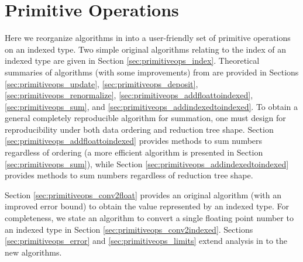 \section{Primitive Operations}
    \label{sec:primitiveops}
    Here we reorganize algorithms in \cite{repsum} into a user-friendly set of
    primitive operations on an indexed type. Two simple original algorithms
    relating to the index of an indexed type are given in Section
    \ref{sec:primitiveops_index}. Theoretical summaries of algorithms (with
    some improvements) from \cite{repsum} are provided in Sections
    \ref{sec:primitiveops_update}, \ref{sec:primitiveops_deposit},
    \ref{sec:primitiveops_renormalize},
    \ref{sec:primitiveops_addfloattoindexed}, \ref{sec:primitiveops_sum},
    and \ref{sec:primitiveops_addindexedtoindexed}. To obtain a general
    completely reproducible algorithm for summation, one must design for
    reproducibility under both data ordering and reduction tree shape.
    Section \ref{sec:primitiveops_addfloattoindexed} provides methods to
    sum numbers regardless of ordering (a more efficient algorithm is presented in Section \ref{sec:primitiveops_sum}), while Section
    \ref{sec:primitiveops_addindexedtoindexed} provides methods to sum
    numbers regardless of reduction tree shape.

    Section \ref{sec:primitiveops_conv2float} provides an original algorithm (with an
    improved error bound) to obtain the value represented by an indexed type.
    For completeness, we state an algorithm to convert a single floating point number to an indexed type in Section \ref{sec:primitiveops_conv2indexed}.
    Sections \ref{sec:primitiveops_error} and \ref{sec:primitiveops_limits}
    extend analysis in \cite{repsum} to the new algorithms.

    
    
    
    
    
    
    
    
    
    
    

